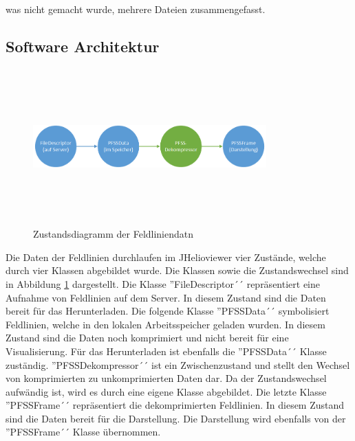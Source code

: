 was nicht gemacht wurde, mehrere Dateien zusammengefasst.

\subsection{Software Architektur}
\begin{figure}[!htbp]
	\center
	\includegraphics[width=0.8\textwidth,height=6cm,keepaspectratio]{./pictures/implementation/dataflow.png}
	\caption{Zustandsdiagramm der Feldliniendatn}
	\label{implementation:architektur:datenfluss}
\end{figure}
Die Daten der Feldlinien durchlaufen im JHelioviewer vier Zustände, welche durch vier Klassen abgebildet wurde. Die Klassen sowie die Zustandswechsel sind in Abbildung \ref{implementation:architektur:datenfluss} dargestellt. Die Klasse ''FileDescriptor´´ repräsentiert eine Aufnahme von Feldlinien auf dem Server. In diesem Zustand sind die Daten bereit für das Herunterladen. Die folgende Klasse ''PFSSData´´ symbolisiert Feldlinien, welche in den lokalen Arbeitsspeicher geladen wurden. In diesem Zustand sind die Daten noch komprimiert und nicht bereit für eine Visualisierung. Für das Herunterladen ist ebenfalls die ''PFSSData´´ Klasse zuständig. ''PFSSDekompressor´´ ist ein Zwischenzustand und stellt den Wechsel von komprimierten zu unkomprimierten Daten dar. Da der Zustandswechsel aufwändig ist, wird es durch eine eigene Klasse abgebildet. Die letzte Klasse ''PFSSFrame´´ repräsentiert die dekomprimierten Feldlinien. In diesem Zustand sind die Daten bereit für die Darstellung. Die Darstellung wird ebenfalls von der ''PFSSFrame´´ Klasse übernommen.

